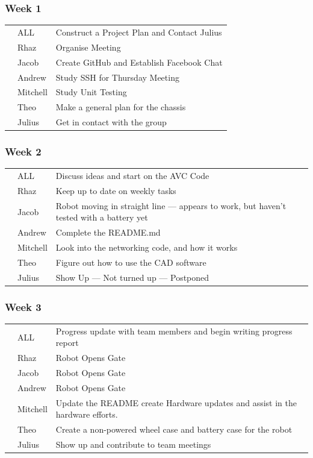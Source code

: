 \documentclass[paper=a4, fontsize=11pt]{scrartcl} %
\def\checkmark{\tikz\fill[scale=0.4] (0,.35) -- (.25,0) -- (1,.7) -- (.25,.15) -- cycle;}
\def\scalecheck{\resizebox{\widthof{\checkmark}*\ratio{\widthof{x}}{\widthof{\normalsize x}}}{!}{\checkmark}}
\numberwithin{equation}{section} %
\numberwithin{figure}{section} %
\begin{document}
\subsubsection*{Week 1}
\begin{tabularx}{\textwidth}{clX}
  \scalecheck & ALL      & Construct a Project Plan and Contact Julius\\
  \scalecheck & Rhaz     & Organise Meeting\\
  \scalecheck & Jacob    & Create GitHub and Establish Facebook Chat\\
  \scalecheck & Andrew   & Study SSH for Thursday Meeting\\
  \scalecheck & Mitchell & Study Unit Testing\\
  \scalecheck & Theo     & Make a general plan for the chassis\\
  \scalecheck & Julius   & Get in contact with the group
\end{tabularx}
\subsubsection*{Week 2}
\begin{tabularx}{\textwidth}{clX}
  \scalecheck  & ALL      & Discuss ideas and start on the AVC Code\\
  \scalecheck  & Rhaz     & Keep up to date on weekly tasks\\
               & Jacob    & Robot moving in straight line --- appears to work, but haven't tested with a battery yet\\
  \scalecheck  & Andrew   & Complete the README.md\\
  \scalecheck  & Mitchell & Look into the networking code, and how it works\\
  \scalecheck  & Theo     & Figure out how to use the CAD software\\
               & Julius   & Show Up --- Not turned up --- Postponed\\
\end{tabularx}
\subsubsection*{Week 3}
\begin{tabularx}{\textwidth}{clX}
  \scalecheck & ALL      & Progress update with team members and begin writing progress report\\
  \scalecheck & Rhaz     & Robot Opens Gate\\
  \scalecheck & Jacob    & Robot Opens Gate\\
  \scalecheck & Andrew   & Robot Opens Gate\\
  \scalecheck & Mitchell & Update the README create Hardware updates and assist in the hardware efforts.\\
  \scalecheck & Theo     & Create a non-powered wheel case and battery case for the robot\\
              & Julius   & Show up and contribute to team meetings\\
\end{tabularx}
\end{document}
